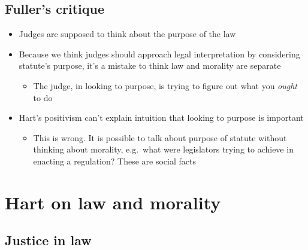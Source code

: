 \hypertarget{fullers-critique}{%
\subsection{Fuller's critique}\label{fullers-critique}}

\begin{itemize}
\tightlist
\item
  Judges are supposed to think about the purpose of the law
\item
  Because we think judges should approach legal interpretation by
  considering statute's purpose, it's a mistake to think law and
  morality are separate

  \begin{itemize}
  \tightlist
  \item
    The judge, in looking to purpose, is trying to figure out what you
    \emph{ought} to do
  \end{itemize}
\item
  Hart's positivism can't explain intuition that looking to purpose is
  important

  \begin{itemize}
  \tightlist
  \item
    This is wrong. It is possible to talk about purpose of statute
    without thinking about morality, e.g.~what were legislators trying
    to achieve in enacting a regulation? These are social facts
  \end{itemize}
\end{itemize}

\hypertarget{hart-on-law-and-morality}{%
\section{Hart on law and morality}\label{hart-on-law-and-morality}}

\hypertarget{justice-in-law}{%
\subsection{Justice in law}\label{justice-in-law}}

